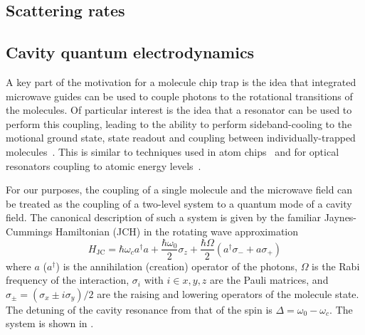 \subsection{Scattering rates}


\subsection{Cavity quantum electrodynamics}

A key part of the motivation for a molecule chip trap is the idea that
integrated microwave guides can be used to couple photons to the rotational
transitions of the molecules. Of particular interest is the idea
that a resonator can be used to perform this coupling, leading to the
ability to perform sideband-cooling to the motional ground state, state readout
and coupling between individually-trapped molecules~\cite{Andre2006}. This is
similar to techniques used in atom chips~\cite{Treutlein2008} and for optical
resonators coupling to atomic energy levels~\cite{SchleierSmith2011}.

For our purposes, the coupling of a single molecule and the microwave field can
be treated as the coupling of a two-level system to a quantum mode of a cavity
field. The canonical description of such a system is given by the familiar
Jaynes-Cummings Hamiltonian (JCH) in the rotating wave
approximation~\cite{gerry_knight_2004}
%
\begin{equation}
  H_\text{JC} = \hbar\omega_c a^\dagger a + \frac{\hbar \omega_0}{2} \sigma_z +
  \frac{\hbar\Omega}{2}(a^\dagger \sigma_- + a\sigma_+)
  \label{theory:eqn:JCH}
\end{equation}
%
where $a$ ($a^\dagger$) is the annihilation (creation) operator of the photons,
$\Omega$ is the Rabi frequency of the interaction, $\sigma_i$ with $i\in{x, y,
z}$ are the Pauli matrices, and $\sigma_\pm =
(\sigma_x \pm i\sigma_y)/2$ are the raising and lowering operators of the
molecule state. The
detuning of the cavity resonance from that of the spin is $\Delta = \omega_0 -
\omega_c$. The system is shown in .

\begin{figure}
  \caption{}
  \label{theory:fig:JCHstates}
\end{figure}

